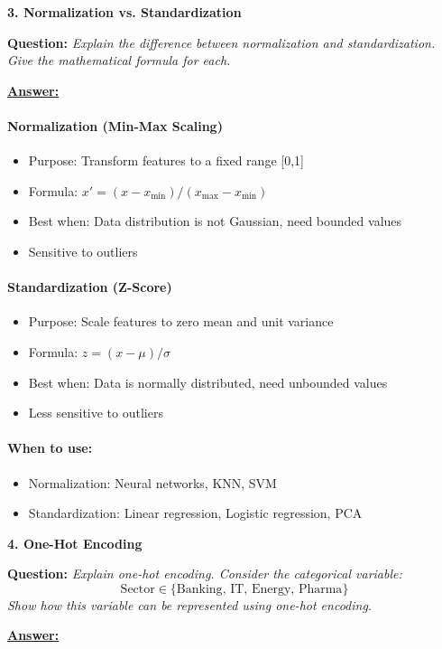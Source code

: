 \documentclass[11pt,a4paper]{article}
\newcommand{\questiontitle}[2]{%
    \vspace{0.4cm}%
    \noindent\textbf{\large\color{headerblue}#1. #2}\par\vspace{0.15cm}%
}
\newcommand{\qprompt}[1]{%
    \noindent\textbf{Question:} \textit{#1}\par\vspace{0.2cm}%
}
\newcommand{\answer}{\noindent\textbf{\underline{Answer:}}\par\vspace{0.15cm}}
\begin{document}
\vspace{0.35cm}

\questiontitle{3}{Normalization vs. Standardization}
\qprompt{Explain the difference between normalization and standardization. Give the mathematical formula for each.}
\answer
\paragraph{Normalization (Min-Max Scaling)}
\begin{itemize}
    \item Purpose: Transform features to a fixed range [0,1]
    \item Formula: $x' = (x - x_{\min}) / (x_{\max} - x_{\min})$
    \item Best when: Data distribution is not Gaussian, need bounded values
    \item Sensitive to outliers
\end{itemize}

\paragraph{Standardization (Z-Score)}
\begin{itemize}
    \item Purpose: Scale features to zero mean and unit variance
    \item Formula: $z = (x - \mu) / \sigma$
    \item Best when: Data is normally distributed, need unbounded values
    \item Less sensitive to outliers
\end{itemize}

\paragraph{When to use:}
\begin{itemize}
    \item Normalization: Neural networks, KNN, SVM
    \item Standardization: Linear regression, Logistic regression, PCA
\end{itemize}

\vspace{0.35cm}

\questiontitle{4}{One-Hot Encoding}
\qprompt{Explain one-hot encoding. Consider the categorical variable:
\[
\text{Sector} \in \{\text{Banking},\, \text{IT},\, \text{Energy},\, \text{Pharma}\}
\]
Show how this variable can be represented using one-hot encoding.}
\answer
\end{document}
